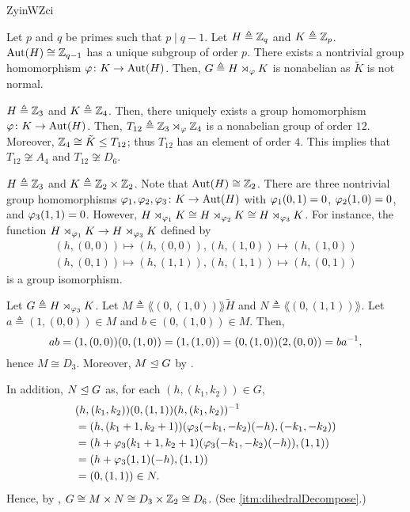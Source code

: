 \documentclass[../modern_algebra.tex]{subfiles}
\begin{document}
\begin{Example}{\textsf{}}{ZyinWZci}
\begin{enumerate}[nolistsep, label=(\roman*), ref=\protect{\Cref{exmp:ZyinWZci} (\roman*)}, listparindent=\parindent]
    \ii
    Let \(p\) and \(q\) be primes such that \(p \mid q - 1\).
    Let \(H \triangleq \ZZ_q\) and \(K \triangleq \ZZ_p\).
    \(\Aut(H) \cong \ZZ_{q-1}\) has a unique subgroup of order \(p\).
    There exists a nontrivial group homomorphism \(\varphi \colon K \to \operatorname{Aut}(H)\).
    Then, \(G \triangleq H \rtimes_{\varphi} K\) is nonabelian as \(\tilde{K}\) is not normal.

    \ii\label{itm:semiZ3XZ4}
    \(H \triangleq \ZZ_3\) and \(K \triangleq \ZZ_4\).
    Then, there uniquely exists a group homomorphism
    \(\varphi \colon K \to \operatorname{Aut}(H)\).
    Then, \(T_{12} \triangleq \ZZ_3 \rtimes_{\vphi} \ZZ_4\)
    is a nonabelian group of order \(12\).
    Moreover, \(\ZZ_4 \cong \tilde{K} \le T_{12}\);
    thus \(T_{12}\) has an element of order \(4\).
    This implies that \(T_{12} \not\cong A_4\) and \(T_{12} \not\cong D_6\).

    \ii\label{itm:semiZ3XZ2Z2}
    \(H \triangleq \ZZ_3\) and \(K \triangleq \ZZ_2 \times \ZZ_2\).
    Note that \(\Aut(H) \cong \ZZ_2\).
    There are three nontrivial group homomorphisms \(\varphi_1, \varphi_2, \varphi_3 \colon K \to \operatorname{Aut}(H)\)
    with \(\varphi_1(0, 1) = 0\), \(\varphi_2(1, 0) = 0\), and \(\varphi_3(1, 1) = 0\).
    However, \(H \rtimes_{\varphi_1} K \cong H \rtimes_{\varphi_2} K \cong H \rtimes_{\varphi_3} K\).
    For instance, the function \(H \rtimes_{\varphi_1} K \to H \rtimes_{\varphi_3} K\)
    defined by
    \begin{gather*}
        (h, (0, 0)) \mapsto (h, (0, 0)), (h, (1, 0)) \mapsto (h, (1, 0)) \\
        (h, (0, 1)) \mapsto (h, (1, 1)), (h, (1, 1)) \mapsto (h, (0, 1))
    \end{gather*}
    is a group isomorphism.

    Let \(G \triangleq H \rtimes_{\varphi_3} K\).
    Let \(M \triangleq \lang (0, (1, 0)) \rang \tilde{H}\)
    and \(N \triangleq \lang (0, (1,1)) \rang\).
    Let \(a \triangleq (1, (0, 0)) \in M\) and \(b \in (0, (1, 0)) \in M\).
    Then,
    \[
        ab = (1, (0, 0)) (0, (1, 0)) = (1, (1, 0)) = (0, (1, 0))(2, (0, 0)) = ba^{-1},
    \]
    hence \(M \cong D_3\).
    Moreover, \(M \trianglelefteq G\) by .

    In addition, \(N \trianglelefteq G\) as, for each \((h, (k_1, k_2)) \in G\),
    \begin{align*}
        &(h, (k_1, k_2))(0, (1, 1))(h, (k_1, k_2))^{-1} \\
        &= (h, (k_1 + 1, k_2 + 1))(\varphi_3(-k_1, -k_2)(-h), (-k_1, -k_2)) \\
        &= (h + \varphi_3(k_1 + 1, k_2 + 1)(\varphi_3(-k_1, -k_2)(-h)), (1, 1)) \\
        &= (h + \varphi_3(1, 1)(-h), (1, 1)) \\
        &= (0, (1, 1)) \in N.
    \end{align*}
    Hence, by , \(G \cong M \times N \cong D_3 \times \ZZ_2 \cong D_6\).
    (See \ref{itm:dihedralDecompose}.)


\end{enumerate}
\end{Example}
\end{document}
